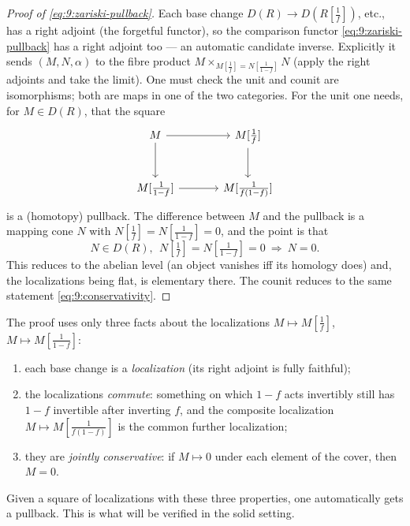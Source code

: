 \begin{proof}[Proof of \eqref{eq:9:zariski-pullback}]
Each base change $D(R)\to D(R[\tfrac1f])$, etc., has a right adjoint (the
forgetful functor), so the comparison functor
\eqref{eq:9:zariski-pullback} has a right adjoint too --- an automatic candidate
inverse. Explicitly it sends $(M,N,\alpha)$ to the fibre product $M\times_{M[
\frac1f]=N[\frac1{1-f}]}N$ (apply the right adjoints and take the limit). One
must check the unit and counit are isomorphisms; both are maps in one of the two
categories. For the unit one needs, for $M\in D(R)$, that the square
\begin{equation*}
\begin{tikzcd}[column sep=large, row sep=large]
M \arrow[r] \arrow[d] & M[\tfrac1f] \arrow[d] \\
M[\tfrac1{1-f}] \arrow[r] & M[\tfrac1{f(1-f)}]
\end{tikzcd}
\end{equation*}
is a (homotopy) pullback. The difference between $M$ and the pullback is a
mapping cone $N$ with $N[\tfrac1f]=N[\tfrac1{1-f}]=0$, and the point is that
\begin{equation}
\label{eq:9:conservativity}
N\in D(R),\ \ N[\tfrac1f]=N[\tfrac1{1-f}]=0\ \Longrightarrow\ N=0.
\end{equation}
This reduces to the abelian level (an object vanishes iff its homology does) and,
the localizations being flat, is elementary there. The counit reduces to the
same statement \eqref{eq:9:conservativity}.
\end{proof}

\begin{remark}
\label{rmk:9:three-ingredients}
The proof uses only three facts about the localizations $M\mapsto M[\tfrac1f]$,
$M\mapsto M[\tfrac1{1-f}]$:
\begin{enumerate}
\item each base change is a \emph{localization} (its right adjoint is fully
faithful);
\item the localizations \emph{commute}: something on which $1-f$ acts invertibly
still has $1-f$ invertible after inverting $f$, and the composite localization
$M\mapsto M[\tfrac1{f(1-f)}]$ is the common further localization;
\item they are \emph{jointly conservative}: if $M\mapsto 0$ under each element of
the cover, then $M=0$.
\end{enumerate}
Given a square of localizations with these three properties, one automatically
gets a pullback. This is what will be verified in the solid setting.
\end{remark}

